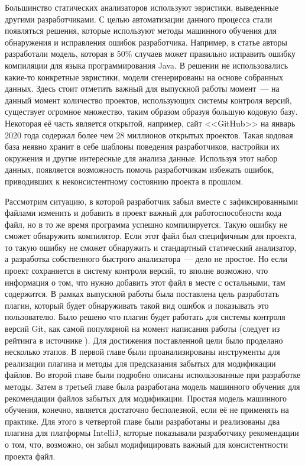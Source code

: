 Большинство статических анализаторов используют эвристики, выведенные другими разработчиками. С целью автоматизации данного процесса стали появляться решения, которые используют методы машинного обучения для обнаружения и исправления ошибок разработчика. Например, в статье \cite{static-analysis-ml} авторы разработали модель, которая в 50\% случаев может правильно исправить ошибку компиляции для языка программирования Java. В решении не использовались какие-то конкретные эвристики, модели сгенерированы на основе собранных данных. Здесь стоит отметить важный для выпускной работы момент~--- на данный момент количество проектов, использующих системы контроля версий, существует огромное множество, таким образом образуя большую кодовую базу. Некоторая её часть является открытой, например, сайт <<GitHub>> на январь 2020 года содержал более чем 28 миллионов открытых проектов. Такая кодовая база неявно хранит в себе шаблоны поведения разработчиков, настройки их окружения и другие интересные для анализа данные. Используя этот набор данных, появляется возможность помочь разработчикам избежать ошибок, приводивших к неконсистентному состоянию проекта в прошлом.

Рассмотрим ситуацию, в которой разработчик забыл вместе с зафиксированными файлами изменить и добавить в проект важный для работоспособности кода файл, но в то же время программа успешно компилируется. Такую ошибку не сможет обнаружить компилятор. Если этот файл был специфичным для проекта, то такую ошибку не сможет обнаружить и стандартный статический анализатор, а разработка собственного быстрого анализатора~--- дело не простое. Но если проект сохраняется в систему контроля версий, то вполне возможно, что информация о том, что нужно добавить этот файл в месте с остальными, там содержится. В рамках выпускной работы была поставлена цель разработать плагин, который будет обнаруживать такой вид ошибок и показывать это пользователю. Было решено что плагин будет работать для системы контроля версий Git, как самой популярной на момент написания работы (следует из рейтинга в источнике \cite{best-vcs}). Для достижения поставленной цели было проделано несколько этапов. В первой главе были проанализированы инструменты для реализации плагина и методы для предсказания забытых для модификации файлов. Во второй главе были подробно описаны использованные при разработке методы. Затем в третьей главе была разработана модель машинного обучения для рекомендации файлов забытых для модификации. Простая модель машинного обучения, конечно, является достаточно бесполезной, если её не применять на практике. Для этого в четвертой главе были разработаны и реализованы два плагина для платформы IntelliJ, которые показывали разработчику рекомендации о том, что, возможно, он забыл модифицировать важный для консистентности проекта файл.